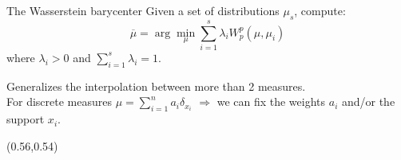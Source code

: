 \documentclass[pdf,aspectratio=169,10pt]{beamer}
\begin{document}
\begin{frame}[plain]{The Wasserstein barycenter}
    Given a set of distributions $\mu_s$, compute: 
    \begin{equation*}
        \overline{\mu} = \arg \min_{\mu} \sum_{i=1}^s \lambda_i W^p_p(\mu, \mu_i)
    \end{equation*}
    where $\lambda_i > 0$ and $\sum_{i=1}^s \lambda_i  = 1$.\vspace{1em}

    Generalizes the interpolation between more than 2 measures.\\
    For discrete measures $\mu = \sum_{i=1}^n a_i \delta_{x_i}$ $\Rightarrow$ we can fix the weights $a_i$ and/or the support $x_i$.
            \begin{textblock}{0.45}(0.56,0.54)
            \end{textblock}
\end{frame}
\end{document}
